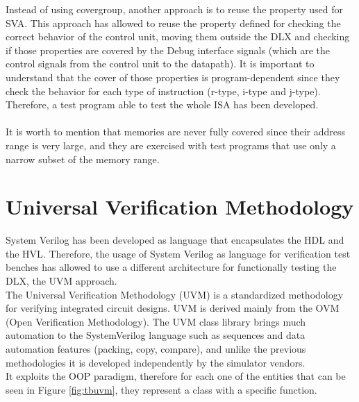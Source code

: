 Instead of using covergroup, another approach is to reuse the property used for SVA. This approach has allowed to reuse the property defined for checking the correct behavior of the control unit, moving them outside the DLX and checking if those properties are covered by the Debug interface signals (which are the control signals from the control unit to the datapath). It is important to understand that the cover of those properties is program-dependent since they check the behavior for each type of instruction (r-type, i-type and j-type). Therefore, a test program able to test the whole ISA has been developed.\\\\
It is worth to mention that memories are never fully covered since their address range is very large, and they are exercised with test programs that use only a narrow subset of the memory range.

\newpage
\section{Universal Verification Methodology}
System Verilog has been developed as language that encapsulates the HDL and the HVL. Therefore, the usage of System Verilog as language for verification test benches has allowed to use a different architecture for functionally testing the DLX, the UVM approach.\\
The Universal Verification Methodology (UVM) is a standardized methodology for verifying integrated circuit designs\cite{paper:3}. UVM is derived mainly from the OVM (Open Verification Methodology). The UVM class library brings much automation to the SystemVerilog language such as sequences and data automation features (packing, copy, compare), and unlike the previous methodologies it is developed independently by the simulator vendors.\\
It exploits the OOP paradigm, therefore for each one of the entities that can be seen in Figure \ref{fig:tbuvm}, they represent a class with a specific function.

